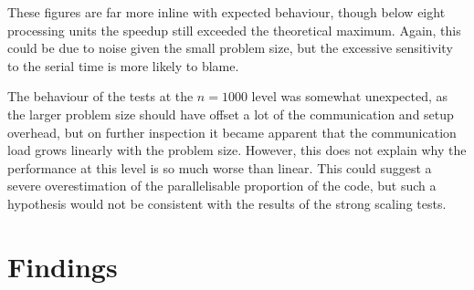 These figures are far more inline with expected behaviour, though below eight processing units the speedup still exceeded the theoretical maximum. Again, this could be due to noise given the small problem size, but the excessive sensitivity to the serial time is more likely to blame.

The behaviour of the tests at the $n=1000$ level was somewhat unexpected, as the larger problem size should have offset a lot of the communication and setup overhead, but on further inspection it became apparent that the communication load grows linearly with the problem size. However, this does not explain why the performance at this level is so much worse than linear. This could suggest a severe overestimation of the parallelisable proportion of the code, but such a hypothesis would not be consistent with the results of the strong scaling tests.

\section{Findings}
